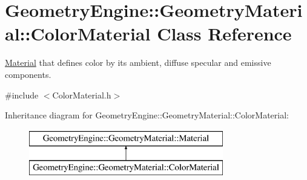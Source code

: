 \hypertarget{class_geometry_engine_1_1_geometry_material_1_1_color_material}{}\section{Geometry\+Engine\+::Geometry\+Material\+::Color\+Material Class Reference}
\label{class_geometry_engine_1_1_geometry_material_1_1_color_material}


\mbox{\hyperlink{class_geometry_engine_1_1_geometry_material_1_1_material}{Material}} that defines color by its ambient, diffuse specular and emissive components.  




{\ttfamily \#include $<$Color\+Material.\+h$>$}

Inheritance diagram for Geometry\+Engine\+::Geometry\+Material\+::Color\+Material\+:\begin{figure}[H]
\begin{center}
\leavevmode
\includegraphics[height=2.000000cm]{class_geometry_engine_1_1_geometry_material_1_1_color_material}
\end{center}
\end{figure}
